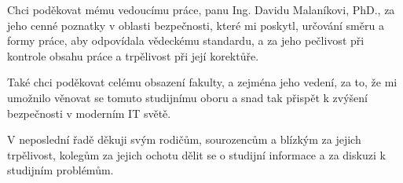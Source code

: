 \documentclass[a4paper,12pt]{article}
\begin{document}
\titulnistrana

\ifsp \else \ifuk \else
{}
\fi \fi

\ifbp \else \ifdp \else
\zadanispuk{}
\fi \fi

\ifsp \else \ifuk \else
\prohlaseni
\fi \fi

\ifsp \else \ifuk \else
\abstraktaklicovaslova
\fi \fi


\ifsp \else \ifuk \else
\clearpage
\thispagestyle{empty}
Chci poděkovat mému vedoucímu práce, panu Ing. Davidu Malaníkovi, PhD., za jeho cenné poznatky v oblasti bezpečnosti, které mi poskytl, určování směru a formy práce, aby odpovídala vědeckému standardu, a za jeho pečlivost při kontrole obsahu práce a trpělivost při její korektůře.

Také chci poděkovat celému obsazení fakulty, a zejména jeho vedení, za to, že mi umožnilo věnovat se tomuto studijnímu oboru a snad tak přispět k zvýšení bezpečnosti v moderním IT světě.

V neposlední řadě děkuji svým rodičům, sourozencům a blízkým za jejich trpělivost, kolegům za jejich ochotu dělit se o studijní informace a za diskuzi k studijním problémům.
\fi \fi

\obsah  %

\OdsazovaniOdstavcuStart %
\okraje


\OdsazovaniOdstavcuStop


\seznamlitbib










\end{document}
